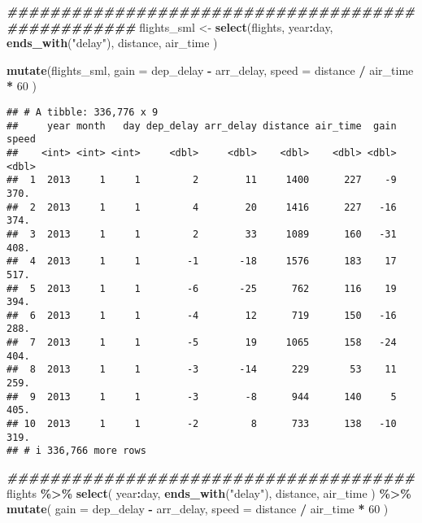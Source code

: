 \documentclass[
]{article}
\newenvironment{Shaded}{\begin{snugshade}}{\end{snugshade}}
\newcommand{\AttributeTok}[1]{\textcolor[rgb]{0.13,0.29,0.53}{#1}}
\newcommand{\DecValTok}[1]{\textcolor[rgb]{0.00,0.00,0.81}{#1}}
\newcommand{\DocumentationTok}[1]{\textcolor[rgb]{0.56,0.35,0.01}{\textbf{\textit{#1}}}}
\newcommand{\FunctionTok}[1]{\textcolor[rgb]{0.13,0.29,0.53}{\textbf{#1}}}
\newcommand{\NormalTok}[1]{#1}
\newcommand{\OtherTok}[1]{\textcolor[rgb]{0.56,0.35,0.01}{#1}}
\newcommand{\SpecialCharTok}[1]{\textcolor[rgb]{0.81,0.36,0.00}{\textbf{#1}}}
\newcommand{\StringTok}[1]{\textcolor[rgb]{0.31,0.60,0.02}{#1}}
\begin{document}
\begin{Shaded}
\begin{Highlighting}[]
\DocumentationTok{\#\#\#\#\#\#\#\#\#\#\#\#\#\#\#\#\#\#\#\#\#\#\#\#\#\#\#\#\#\#\#\#\#\#\#\#\#\#\#\#\#\#\#\#\#\#\#\#\#\#}
\NormalTok{flights\_sml }\OtherTok{\textless{}{-}} \FunctionTok{select}\NormalTok{(flights, }
\NormalTok{                        year}\SpecialCharTok{:}\NormalTok{day, }
                        \FunctionTok{ends\_with}\NormalTok{(}\StringTok{"delay"}\NormalTok{), }
\NormalTok{                        distance, }
\NormalTok{                        air\_time}
\NormalTok{                      )}

\FunctionTok{mutate}\NormalTok{(flights\_sml,}
          \AttributeTok{gain =}\NormalTok{ dep\_delay }\SpecialCharTok{{-}}\NormalTok{ arr\_delay,}
          \AttributeTok{speed =}\NormalTok{ distance }\SpecialCharTok{/}\NormalTok{ air\_time }\SpecialCharTok{*} \DecValTok{60}
\NormalTok{        )}
\end{Highlighting}
\end{Shaded}

\begin{verbatim}
## # A tibble: 336,776 x 9
##     year month   day dep_delay arr_delay distance air_time  gain speed
##    <int> <int> <int>     <dbl>     <dbl>    <dbl>    <dbl> <dbl> <dbl>
##  1  2013     1     1         2        11     1400      227    -9  370.
##  2  2013     1     1         4        20     1416      227   -16  374.
##  3  2013     1     1         2        33     1089      160   -31  408.
##  4  2013     1     1        -1       -18     1576      183    17  517.
##  5  2013     1     1        -6       -25      762      116    19  394.
##  6  2013     1     1        -4        12      719      150   -16  288.
##  7  2013     1     1        -5        19     1065      158   -24  404.
##  8  2013     1     1        -3       -14      229       53    11  259.
##  9  2013     1     1        -3        -8      944      140     5  405.
## 10  2013     1     1        -2         8      733      138   -10  319.
## # i 336,766 more rows
\end{verbatim}

\begin{Shaded}
\begin{Highlighting}[]
\DocumentationTok{\#\#\#\#\#\#\#\#\#\#\#\#\#\#\#\#\#\#\#\#\#\#\#\#\#\#\#\#\#\#\#\#\#\#\#\#\#\#}
\NormalTok{flights }\SpecialCharTok{\%\textgreater{}\%} \FunctionTok{select}\NormalTok{(     year}\SpecialCharTok{:}\NormalTok{day, }
                        \FunctionTok{ends\_with}\NormalTok{(}\StringTok{"delay"}\NormalTok{), }
\NormalTok{                        distance, }
\NormalTok{                        air\_time}
\NormalTok{                      ) }\SpecialCharTok{\%\textgreater{}\%} 
            \FunctionTok{mutate}\NormalTok{(}
            \AttributeTok{gain =}\NormalTok{ dep\_delay }\SpecialCharTok{{-}}\NormalTok{ arr\_delay,}
            \AttributeTok{speed =}\NormalTok{ distance }\SpecialCharTok{/}\NormalTok{ air\_time }\SpecialCharTok{*} \DecValTok{60}
\NormalTok{            )}
\end{Highlighting}
\end{Shaded}
\end{document}
